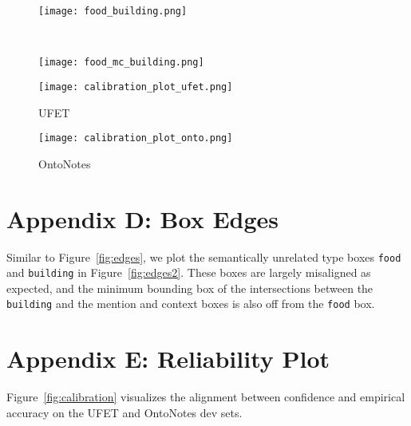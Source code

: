 \documentclass[11pt,a4paper]{article}
\begin{document}
\begin{figure*}[t!]
\centering
\begin{subfigure}[H]{\linewidth}
  \texttt{[image: food\_building.png]}
  \vspace{-16pt}
  \caption{}
\end{subfigure}\\
\vspace{6pt}
\begin{subfigure}[H]{\linewidth}
  \texttt{[image: food\_mc\_building.png]}
  \vspace{-16pt}
  \caption{}
\end{subfigure}
\vspace{-6pt}
\caption{Edges of (a) the {\tt food} box vs the {\tt building} box and (b) the {\tt food} box vs the minimum bounding box of the intersections between mention \& context boxes and the {\tt building} box.}
\label{fig:edges2}
\end{figure*}




\begin{figure*}[t]
\centering
\begin{subfigure}[H]{\columnwidth}
\centering
   \texttt{[image: calibration\_plot\_ufet.png]}
   \caption{UFET}
\end{subfigure}
\begin{subfigure}[H]{\columnwidth}
\centering
   \texttt{[image: calibration\_plot\_onto.png]}
   \caption{OntoNotes}
\end{subfigure}
\caption{Reliability Plots on (a) UFET and (b) OntoNotes.}
\label{fig:calibration}
\end{figure*}





\section*{Appendix D: Box Edges}\label{app:box_overlaps}

Similar to Figure~\ref{fig:edges}, we plot the semantically unrelated type boxes {\tt food} and {\tt building} in Figure~\ref{fig:edges2}. These boxes are largely misaligned as expected, and the minimum bounding box of the intersections between the {\tt building} and the mention and context boxes is also off from the {\tt food} box. 



\section*{Appendix E: Reliability Plot}\label{app:calibration}
Figure~\ref{fig:calibration} visualizes the alignment between confidence and empirical accuracy on the UFET and OntoNotes dev sets. 
\end{document}
